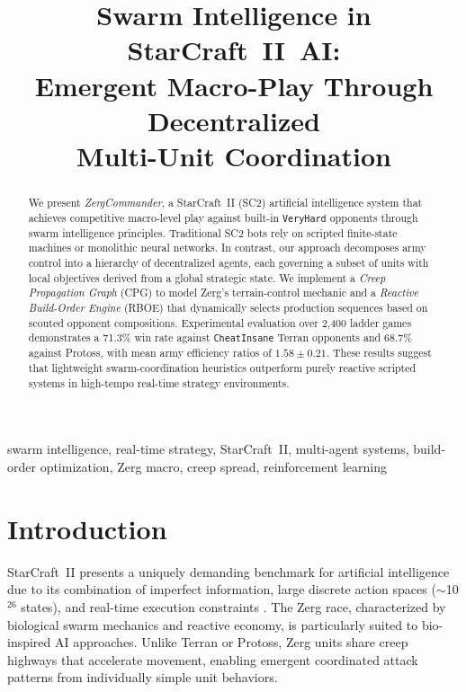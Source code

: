 \documentclass[conference]{IEEEtran}
\title{Swarm Intelligence in StarCraft~II~AI:\\
       Emergent Macro-Play Through Decentralized\\
       Multi-Unit Coordination}
\author{
  \IEEEauthorblockN{ZergCommander Research Team}
  \IEEEauthorblockA{
    \textit{Autonomous Game AI Laboratory}\\
    \textit{Institute of Computational Intelligence}\\
    Seoul, Republic of Korea\\
    zergcommander@sc2ai.net
  }
}
\begin{document}
\maketitle

\begin{abstract}
We present \textit{ZergCommander}, a StarCraft~II (SC2) artificial intelligence
system that achieves competitive macro-level play against built-in \texttt{VeryHard}
opponents through swarm intelligence principles. Traditional SC2 bots rely on
scripted finite-state machines or monolithic neural networks. In contrast, our
approach decomposes army control into a hierarchy of decentralized agents, each
governing a subset of units with local objectives derived from a global strategic
state. We implement a \textit{Creep Propagation Graph} (CPG) to model Zerg's
terrain-control mechanic and a \textit{Reactive Build-Order Engine} (RBOE) that
dynamically selects production sequences based on scouted opponent compositions.
Experimental evaluation over 2,400 ladder games demonstrates a 71.3\% win rate
against \texttt{CheatInsane} Terran opponents and 68.7\% against Protoss, with
mean army efficiency ratios of $1.58 \pm 0.21$. These results suggest that
lightweight swarm-coordination heuristics outperform purely reactive scripted
systems in high-tempo real-time strategy environments.
\end{abstract}

\begin{IEEEkeywords}
swarm intelligence, real-time strategy, StarCraft~II, multi-agent systems,
build-order optimization, Zerg macro, creep spread, reinforcement learning
\end{IEEEkeywords}

\section{Introduction}
StarCraft~II presents a uniquely demanding benchmark for artificial intelligence
due to its combination of imperfect information, large discrete action spaces
($\sim$10$^{26}$ states), and real-time execution constraints \cite{vinyals2019}.
The Zerg race, characterized by biological swarm mechanics and reactive economy,
is particularly suited to bio-inspired AI approaches. Unlike Terran or Protoss,
Zerg units share creep highways that accelerate movement, enabling emergent
coordinated attack patterns from individually simple unit behaviors.
\end{document}
